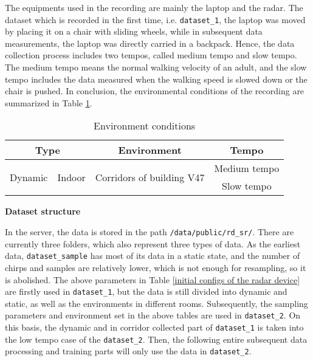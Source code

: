 The equipments used in the recording are mainly the laptop and the radar. The dataset which is recorded in the first time, i.e. \texttt{dataset\_1}, the laptop was moved by placing it on a chair with sliding wheels, while in subsequent data measurements, the laptop was directly carried in a backpack. Hence, the data collection process includes two tempos, called medium tempo and slow tempo. The medium tempo means the normal walking velocity of an adult, and the slow tempo includes the data measured when the walking speed is slowed down or the chair is pushed. In conclusion, the environmental conditions of the recording are summarized in Table \ref{environment conditions}.

\begin{table}
    \centering
    \caption{Environment conditions}
    \label{environment conditions}
    \begin{tabular}{c|c|c|c}
    \hline
    \multicolumn{2}{c|}{\textbf{Type}} & \textbf{Environment} & \textbf{Tempo} \\
    \hline
    \multirow{2}{*}{Dynamic} & \multirow{2}{*}{Indoor} & \multirow{2}{*}{Corridors of building V47} & Medium tempo\\
    \cline{4-4}
    & & & Slow tempo \\
    \hline
    \end{tabular}
\end{table}

\begin{spacing}{1.5}
\textbf{\large{Dataset structure}}
\end{spacing}

In the server, the data is stored in the path \texttt{/data/public/rd\_sr/}. There are currently three folders, which also represent three types of data. As the earliest data, \texttt{dataset\_sample} has most of its data in a static state, and the number of chirps and samples are relatively lower, which is not enough for resampling, so it is abolished. The above parameters in Table \ref{initial configs of the radar device} are firstly used in \texttt{dataset\_1}, but the data is still divided into dynamic and static, as well as the environments in different rooms. Subsequently, the sampling parameters and environment set in the above tables are used in \texttt{dataset\_2}. On this basis, the dynamic and in corridor collected part of \texttt{dataset\_1} is taken into the low tempo case of the \texttt{dataset\_2}. Then, the following entire subsequent data processing and training parts will only use the data in \texttt{dataset\_2}.

